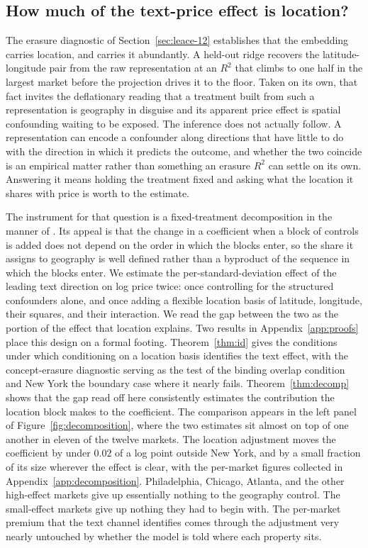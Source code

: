 
\subsection{How much of the text-price effect is location?}
\label{sec:decomposition}

The erasure diagnostic of Section~\ref{sec:leace-12} establishes that the
embedding carries location, and carries it abundantly. A held-out ridge
recovers the latitude-longitude pair from the raw representation at an $R^2$ that
climbs to one half in the largest market before the projection drives it to the
floor. Taken on its own, that fact invites the deflationary reading that a
treatment built from such a representation is geography in disguise and its
apparent price effect is spatial confounding waiting to be exposed. The inference
does not actually follow. A representation can encode a confounder along
directions that have little to do with the direction in which it predicts the
outcome, and whether the two coincide is an empirical matter rather than something
an erasure $R^2$ can settle on its own. Answering it means holding the treatment
fixed and asking what the location it shares with price is worth to the
estimate.

The instrument for that question is a fixed-treatment decomposition in the manner
of \citet{gelbach2016covariates}. Its appeal is that the change in a coefficient
when a block of controls is added does not depend on the order in which the blocks
enter, so the share it assigns to geography is well defined rather than a
byproduct of the sequence in which the blocks enter. We estimate the per-standard-deviation effect of the
leading text direction on log price twice: once controlling for the structured
confounders alone, and once adding a flexible location basis of latitude,
longitude, their squares, and their interaction. We read the gap between the
two as the portion of the effect that location explains. Two results in
Appendix~\ref{app:proofs} place this design on a formal footing.
Theorem~\ref{thm:id} gives the conditions under which conditioning on a location
basis identifies the text effect, with the concept-erasure diagnostic serving as the
test of the binding overlap condition and New York the boundary case where it nearly
fails. Theorem~\ref{thm:decomp} shows that the gap read off here consistently
estimates the contribution the location block makes to the coefficient. The
comparison appears in the left panel of Figure~\ref{fig:decomposition}, where the two estimates sit
almost on top of one another in eleven of the twelve markets. The location
adjustment moves the coefficient by under $0.02$ of a log point
outside New York, and by a small fraction of its size wherever the effect is
clear, with the per-market figures collected in
Appendix~\ref{app:decomposition}. Philadelphia, Chicago, Atlanta, and the other high-effect markets give up
essentially nothing to the geography control. The small-effect markets give up
nothing they had to begin with. The per-market premium that the text channel
identifies comes through the adjustment very nearly untouched by whether the model
is told where each property sits.

